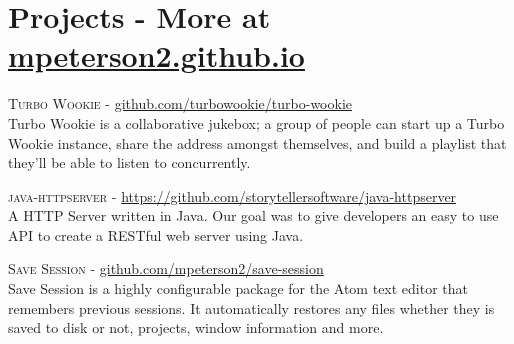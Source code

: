 \documentclass[letterpaper,10pt]{article}
\begin{document}
    \section{Projects - More at \href{http://mpeterson2.github.io}{mpeterson2.github.io}}

        \textsc{Turbo Wookie} -     \href{https://github.com/turbowookie/turbo-wookie}{github.com/turbowookie/turbo-wookie} \\
        Turbo Wookie is a collaborative jukebox; a group of people can start up a Turbo Wookie instance, share the address amongst themselves, and build a playlist that they'll be able to listen to concurrently.

        \textsc{java-httpserver} -  \href{https://github.com/storytellersoftware/java-httpserver}{https://github.com/storytellersoftware/java-httpserver} \\
        A HTTP Server written in Java. Our goal was to give developers an easy to use API to create a RESTful web server using Java.

        \textsc{Save Session} - \href{https://github.com/mpeterson2/save-session}{github.com/mpeterson2/save-session} \\
        Save Session is a highly configurable package for the Atom text editor that remembers previous sessions. It automatically restores any files whether they is saved to disk or not, projects, window information and more.

\end{document}
